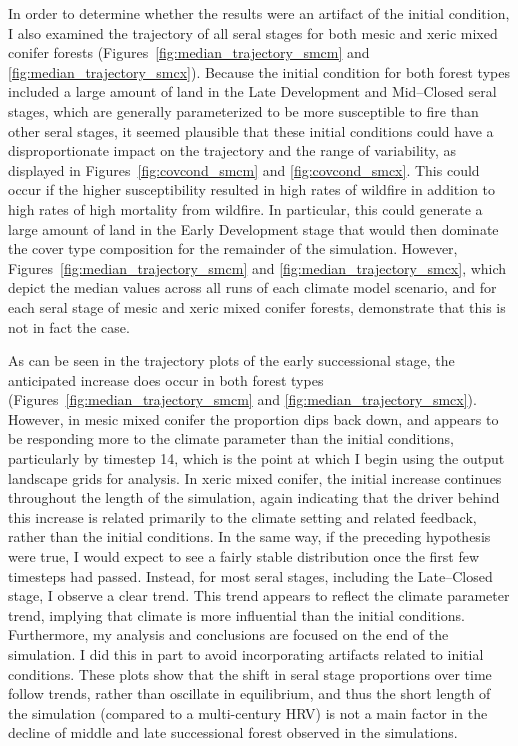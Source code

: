In order to determine whether the results were an artifact of the initial condition, I also examined the trajectory of all seral stages for both mesic and xeric mixed conifer forests (Figures~\ref{fig:median_trajectory_smcm} and \ref{fig:median_trajectory_smcx}). Because the initial condition for both forest types included a large amount of land in the Late Development and Mid--Closed seral stages, which are generally parameterized to be more susceptible to fire than other seral stages, it seemed plausible that these initial conditions could have a disproportionate impact on the trajectory and the range of variability, as displayed in Figures~\ref{fig:covcond_smcm} and \ref{fig:covcond_smcx}. This could occur if the higher susceptibility resulted in high rates of wildfire in addition to high rates of high mortality from wildfire. In particular, this could generate a large amount of land in the Early Development stage that would then dominate the cover type composition for the remainder of the simulation. However, Figures~\ref{fig:median_trajectory_smcm} and \ref{fig:median_trajectory_smcx}, which depict the median values across all runs of each climate model scenario, and for each seral stage of mesic and xeric mixed conifer forests, demonstrate that this is not in fact the case. 

As can be seen in the trajectory plots of the early successional stage, the anticipated increase does occur in both forest types (Figures~\ref{fig:median_trajectory_smcm} and \ref{fig:median_trajectory_smcx}). However, in mesic mixed conifer the proportion dips back down, and appears to be responding more to the climate parameter than the initial conditions, particularly by timestep 14, which is the point at which I begin using the output landscape grids for analysis. In xeric mixed conifer, the initial increase continues throughout the length of the simulation, again indicating that the driver behind this increase is related primarily to the climate setting and related feedback, rather than the initial conditions. In the same way, if the preceding hypothesis were true, I would expect to see a fairly stable distribution once the first few timesteps had passed. Instead, for most seral stages, including the Late--Closed stage, I observe a clear trend. This trend appears to reflect the climate parameter trend, implying that climate is more influential than the initial conditions. Furthermore, my analysis and conclusions are focused on the end of the simulation. I did this in part to avoid incorporating artifacts related to initial conditions. These plots show that the shift in seral stage proportions over time follow trends, rather than oscillate in equilibrium, and thus the short length of the simulation (compared to a multi-century HRV) is not a main factor in the decline of middle and late successional forest observed in the simulations.

